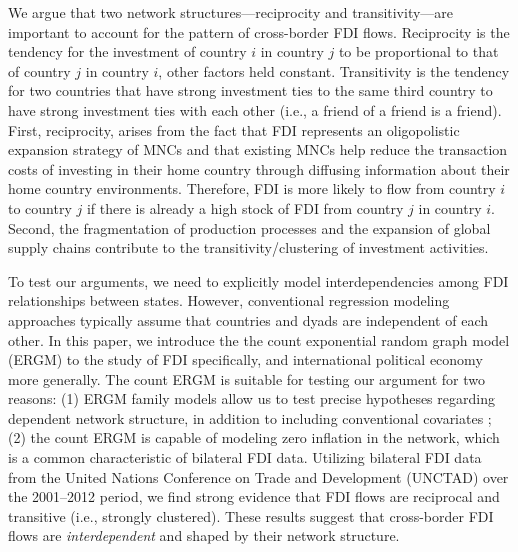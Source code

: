 \documentclass[reqno,onecolumn,letterpaper,12pt]{article}
\begin{document}
We argue that two network structures---reciprocity and transitivity---are important to account for the pattern of cross-border FDI flows. Reciprocity is the tendency for the investment of country $i$ in country $j$ to be proportional to that of country $j$ in country $i$, other factors held constant. Transitivity is the tendency for two countries that have strong investment ties to the same third country to have strong investment ties with each other (i.e., a friend of a friend is a friend). First, reciprocity, arises from the fact that FDI represents an oligopolistic expansion strategy of MNCs and that existing MNCs help reduce the transaction costs of investing in their home country through diffusing information about their home country environments. Therefore, FDI is more likely to flow from country $i$ to country $j$ if there is already a high stock of FDI from country $j$ in country $i$. %
Second, the fragmentation of production processes and the expansion of global supply chains contribute to the transitivity/clustering of investment activities. %

To test our arguments, we need to explicitly model interdependencies among FDI relationships between states. However,  conventional regression modeling approaches typically assume that countries and dyads are independent of each other. In this paper, we introduce the the count exponential random graph model (ERGM) \citep{krivitsky2012exponential} to the study of FDI specifically, and international political economy more generally. The count ERGM is suitable for testing our argument for two reasons: (1) ERGM family models allow us to test precise hypotheses regarding dependent network structure, in addition to including conventional covariates \citep{cranmer2016critique,desmarais2017statistical}; (2) the count ERGM is capable of modeling zero inflation in the network, which is a common characteristic of bilateral FDI data. Utilizing bilateral FDI data from the United Nations Conference on Trade and Development (UNCTAD) over the 2001--2012 period, we find strong evidence that FDI flows are reciprocal and transitive (i.e., strongly clustered). These results suggest that cross-border FDI flows are \textit{interdependent} and shaped by their network structure. %
\end{document}
